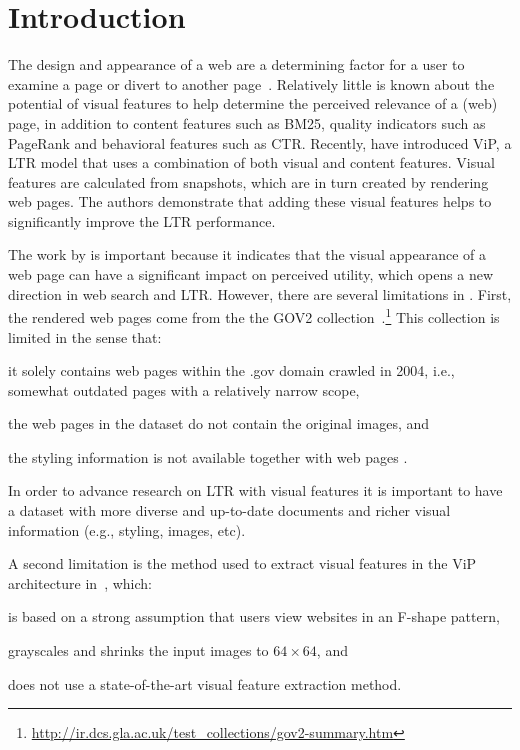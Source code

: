 
\section{Introduction}
The design and appearance of a web are a determining factor for a user to examine a page or divert to another page~\cite{nielsen1999designing,nielsen2006f,pernice2017f,wang2014eye}.
Relatively little is known about the potential of visual features to help determine the perceived relevance of  a (web) page, in addition to content features such as BM25, quality indicators such as PageRank and behavioral features such as CTR.
Recently, \citet{fan2017learning} have introduced ViP, a \ac{LTR} model that uses a combination of both visual and content features.
Visual features are calculated from snapshots, which are in turn created by rendering web pages.
The authors demonstrate that adding these visual features helps to significantly improve the \ac{LTR} performance.

The work by \citet{fan2017learning} is important because it indicates that the visual appearance of a web page can have a significant impact on perceived utility, which opens a new direction in web search and \ac{LTR}.
However, there are several limitations in \cite{fan2017learning}.
First, the rendered web pages come from the the GOV2 collection~.\footnote{\url{http://ir.dcs.gla.ac.uk/test_collections/gov2-summary.htm}}
This collection is limited in the sense that:
\begin{inparaenum}[(i)]
\item it solely contains web pages within the .gov domain crawled in 2004, i.e., somewhat outdated pages with a relatively narrow scope,
\item the web pages in the dataset do not contain the original images, and
\item the styling information is not available together with web pages .
\end{inparaenum}
In order to advance research on \ac{LTR} with visual features it is important to have a dataset with more diverse and up-to-date documents and richer visual information (e.g., styling, images, etc).

A second limitation is the method used to extract visual features in the ViP architecture in~\citet{fan2017learning}, which: 
\begin{inparaenum}[(i)]
\item is based on a strong assumption that users view websites in an F-shape pattern, 
\item grayscales and shrinks the input images to $64\times64$, and
\item does not use a state-of-the-art visual feature extraction method.
\end{inparaenum}

